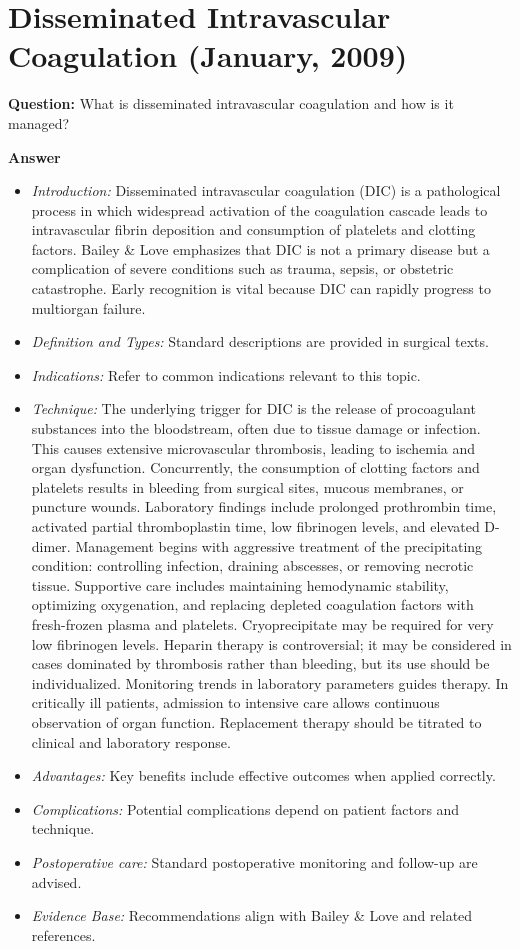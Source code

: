 \documentclass{article}
\begin{document}
\section{Disseminated Intravascular Coagulation (January, 2009)}

\textbf{Question:} What is disseminated intravascular coagulation and how is it managed?

\textbf{Answer}
\begin{itemize}

\item \emph{Introduction:} Disseminated intravascular coagulation (DIC) is a pathological process in which widespread activation of the coagulation cascade leads to intravascular fibrin deposition and consumption of platelets and clotting factors. Bailey \& Love emphasizes that DIC is not a primary disease but a complication of severe conditions such as trauma, sepsis, or obstetric catastrophe. Early recognition is vital because DIC can rapidly progress to multiorgan failure.
\item \emph{Definition and Types:} Standard descriptions are provided in surgical texts.
\item \emph{Indications:} Refer to common indications relevant to this topic.

\item \emph{Technique:} The underlying trigger for DIC is the release of procoagulant substances into the bloodstream, often due to tissue damage or infection. This causes extensive microvascular thrombosis, leading to ischemia and organ dysfunction. Concurrently, the consumption of clotting factors and platelets results in bleeding from surgical sites, mucous membranes, or puncture wounds. Laboratory findings include prolonged prothrombin time, activated partial thromboplastin time, low fibrinogen levels, and elevated D-dimer. Management begins with aggressive treatment of the precipitating condition: controlling infection, draining abscesses, or removing necrotic tissue. Supportive care includes maintaining hemodynamic stability, optimizing oxygenation, and replacing depleted coagulation factors with fresh-frozen plasma and platelets. Cryoprecipitate may be required for very low fibrinogen levels. Heparin therapy is controversial; it may be considered in cases dominated by thrombosis rather than bleeding, but its use should be individualized. Monitoring trends in laboratory parameters guides therapy. In critically ill patients, admission to intensive care allows continuous observation of organ function. Replacement therapy should be titrated to clinical and laboratory response.
\item \emph{Advantages:} Key benefits include effective outcomes when applied correctly.
\item \emph{Complications:} Potential complications depend on patient factors and technique.
\item \emph{Postoperative care:} Standard postoperative monitoring and follow-up are advised.
\item \emph{Evidence Base:} Recommendations align with Bailey \& Love and related references.


\end{itemize}
\end{document}
